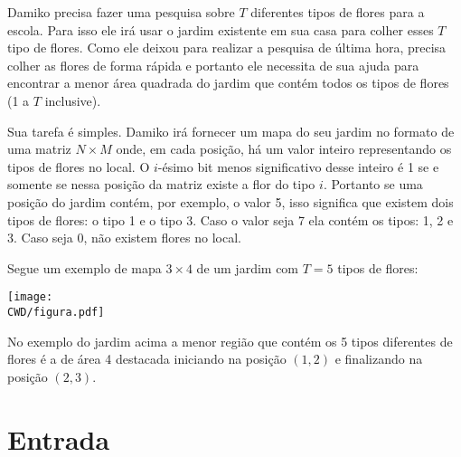 

%


Damiko precisa fazer uma pesquisa sobre $T$ diferentes tipos de flores para a escola.
 Para isso ele irá usar o jardim existente em sua casa para colher esses $T$ tipo de flores.
 Como ele deixou para realizar a pesquisa de última hora, precisa colher as flores de forma rápida e portanto ele necessita de sua ajuda para encontrar a menor área quadrada do jardim que contém todos os tipos de flores (1 a $T$ inclusive).



Sua tarefa é simples.
Damiko irá fornecer um mapa do seu jardim no formato de uma matriz $N \times M$ onde, em cada posição, há um valor inteiro representando os tipos de flores no local.
O $i$-ésimo bit menos significativo desse inteiro é 1 se e somente se nessa posição da matriz existe a flor do tipo $i$. 
 Portanto se uma posição do jardim contém, por exemplo, o valor 5, isso significa que existem dois tipos de flores: o tipo 1 e o tipo 3.
 Caso o valor seja 7 ela contém os tipos:  1, 2 e 3.
 Caso seja 0, não existem flores no local.

Segue um exemplo de mapa $3 \times 4$ de um jardim com $T=5$ tipos de flores:

\begin{center}
  \texttt{[image: \\CWD/figura.pdf]}
\end{center}

No exemplo do jardim acima a menor região que contém os 5 tipos diferentes de flores é a de área 4 destacada iniciando na posição $(1, 2)$ e finalizando na posição $(2, 3)$.


\section*{Entrada}

